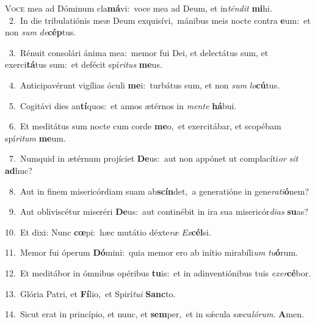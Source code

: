 \lettrine{\initial\textcolor{\initialcolor}{V}}{oce} mea ad Dóminum cla\-\textbf{má}\-vi:~\star voce mea ad Deum, et in\-\textit{tén}\-\textit{dit} \textbf{mi}\-hi.\\
{\numbfont\textcolor{\numbcolor}{~2.}}~In die tribulatiónis meæ Deum exquisívi,~\dagger mánibus meis nocte contra \textbf{e}\-um:~\star et non \textit{sum} \textit{de}\-\textbf{cép}tus.\par
{\numbfont\textcolor{\numbcolor}{~3.}}~Rénuit consolári ánima mea:~\dagger memor fui Dei, et delectátus sum, et exerci\-\textbf{tá}\-tus sum:~\star et defécit spí\-\textit{ri}\-\textit{tus} \textbf{me}\-us.\par
{\numbfont\textcolor{\numbcolor}{~4.}}~Anticipavérunt vigílias óculi \textbf{me}\-i:~\star turbátus sum, et non \textit{sum} \textit{lo}\-\textbf{cú}tus.\par
{\numbfont\textcolor{\numbcolor}{~5.}}~Cogitávi dies an\-\textbf{tí}\-quos:~\star et annos ætérnos in \textit{men}\-\textit{te} \textbf{há}\-bui.\par
{\numbfont\textcolor{\numbcolor}{~6.}}~Et meditátus sum nocte cum corde \textbf{me}\-o,~\star et exercitábar, et scopébam spí\-\textit{ri}\-\textit{tum} \textbf{me}\-um.\par
{\numbfont\textcolor{\numbcolor}{~7.}}~Numquid in ætérnum projíciet \textbf{De}\-us:~\star aut non appónet ut complacíti\textit{or} \textit{sit} \textbf{ad}\-huc?\par
{\numbfont\textcolor{\numbcolor}{~8.}}~Aut in finem misericórdiam suam ab\-\textbf{scín}\-det,~\star a generatióne in gene\-\textit{ra}\-\textit{ti}\textbf{ó}nem?\par
{\numbfont\textcolor{\numbcolor}{~9.}}~Aut obliviscétur miseréri \textbf{De}\-us:~\star aut continébit in ira sua misericór\-\textit{di}\-\textit{as} \textbf{su}\-as?\par
{\numbfont\textcolor{\numbcolor}{10.}}~Et dixi: Nunc \textbf{cœ}\-pi:~\star hæc mutátio déxte\textit{ræ} \textit{Ex}\-\textbf{cél}si.\par
{\numbfont\textcolor{\numbcolor}{11.}}~Memor fui óperum \textbf{Dó}\-mini:~\star quia memor ero ab inítio mirabíli\textit{um} \textit{tu}\-\textbf{ó}rum.\par
{\numbfont\textcolor{\numbcolor}{12.}}~Et meditábor in ómnibus opéribus \textbf{tu}\-is:~\star et in adinventiónibus tuis \textit{ex}\-\textit{er}\textbf{cé}bor.\par
{\numbfont\textcolor{\numbcolor}{13.}}~Glória Patri, et \textbf{Fí}\-lio,~\star et Spirí\-\textit{tu}\-\textit{i} \textbf{Sanc}\-to.\par
{\numbfont\textcolor{\numbcolor}{14.}}~Sicut erat in princípio, et nunc, et \textbf{sem}\-per,~\star et in sǽcula sæcu\-\textit{ló}\-\textit{rum}. \textbf{A}\-men.\par
